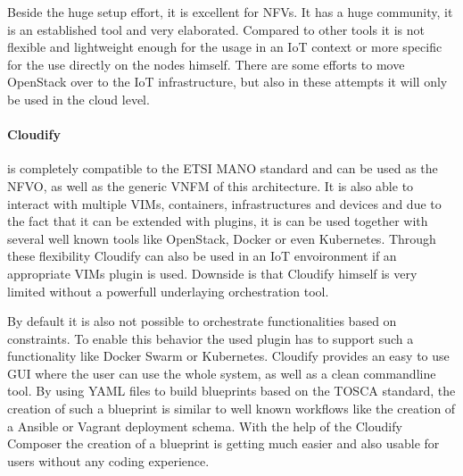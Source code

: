 Beside the huge setup effort, it is excellent for \acp{NFV}.
It has a huge community, it is an established tool and very elaborated.
Compared to other tools it is not flexible and lightweight enough for the usage in an \ac{IoT} context or more specific for the use directly on the nodes himself.
There are some efforts to move OpenStack over to the \ac{IoT} infrastructure\autocite{OpenStack:IoT}\autocite{OpenStack:Kubernetes:IoT}, but also in these attempts it will only be used in the cloud level.

\paragraph{Cloudify} is completely compatible to the \ac{ETSI} \ac{MANO} standard and can be used as the \ac{NFVO}, as well as the generic \ac{VNFM} of this architecture.\cite[cf.]{Cloudify:MANO}
It is also able to interact with multiple \acp{VIM}, containers, infrastructures and devices and due to the fact that it can be extended with plugins, it is can be used together with several well known tools like OpenStack, Docker or even Kubernetes.\cite[cf.]{Cloudify:MANO}
Through these flexibility Cloudify can also be used in an \ac{IoT} envoironment if an appropriate \acp{VIM} plugin is used.
Downside is that Cloudify himself is very limited without a powerfull underlaying orchestration tool.

By default it is also not possible to orchestrate functionalities based on constraints.
To enable this behavior the used plugin has to support such a functionality like Docker Swarm or Kubernetes.
Cloudify provides an easy to use \ac{GUI} where the user can use the whole system, as well as a clean commandline tool.
By using \ac{YAML} files to build blueprints based on the \ac{TOSCA} standard, the creation of such a blueprint is similar to well known workflows like the creation of a Ansible or Vagrant deployment schema.
With the help of the Cloudify Composer the creation of a blueprint is getting much easier and also usable for users without any coding experience.

